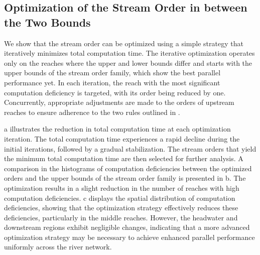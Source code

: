 \documentclass[water,article,submit,pdftex,moreauthors]{Definitions/mdpi}
\providecommand{\DIFadd}[1]{{\protect\color{blue}\uwave{#1}}} %
\providecommand{\DIFaddbegin}{} %
\providecommand{\DIFaddend}{} %
\begin{document}
\subsection{\DIFaddbegin \DIFadd{Performance-Guided }\DIFaddend Optimization of the Stream Order in between the Two Bounds}
\label{sec:optimization_yangtze}

We show that the stream order can be optimized using a simple strategy that iteratively minimizes total computation time. The iterative optimization operates only on the reaches where the upper and lower bounds differ and starts with the upper bounds of the stream order family, which show the best parallel performance yet. In each iteration, the reach with the most significant computation deficiency is targeted, with its order being reduced by one. Concurrently, appropriate adjustments are made to the orders of upstream reaches to ensure adherence to the two rules outlined in .

a illustrates the reduction in total computation time at each optimization iteration. The total computation time experiences a rapid decline during the initial iterations, followed by a gradual stabilization. The stream orders that yield the minimum total computation time are then selected for further analysis. A comparison in the histograms of computation deficiencies between the optimized orders and the upper bounds of the stream order family is presented in b. The optimization results in a slight reduction in the number of reaches with high computation deficiencies. c displays the spatial distribution of computation deficiencies, showing that the optimization strategy effectively reduces these deficiencies, particularly in the middle reaches. However, the headwater and downstream regions exhibit negligible changes, indicating that a more advanced optimization strategy may be necessary to achieve enhanced parallel performance uniformly across the river network.
\end{document}
